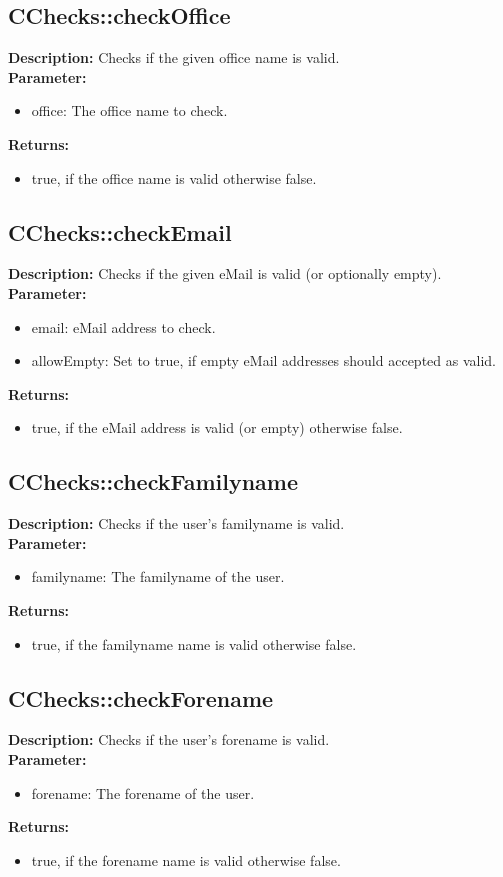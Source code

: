 \subsection{CChecks::checkOffice}
\textbf{Description:} Checks if the given office name is valid.\\
\textbf{Parameter:}
\begin{itemize}
\item office: The office name to check.
\end{itemize}
\textbf{Returns:}
\begin{itemize}
\item true, if the office name is valid otherwise false.
\end{itemize}

\subsection{CChecks::checkEmail}
\textbf{Description:} Checks if the given eMail is valid (or optionally empty).\\
\textbf{Parameter:}
\begin{itemize}
\item email: eMail address to check.
\item allowEmpty: Set to true, if empty eMail addresses should accepted as valid.
\end{itemize}
\textbf{Returns:}
\begin{itemize}
\item true, if the eMail address is valid (or empty) otherwise false.
\end{itemize}

\subsection{CChecks::checkFamilyname}
\textbf{Description:} Checks if the user's familyname is valid.\\
\textbf{Parameter:}
\begin{itemize}
\item familyname: The familyname of the user.
\end{itemize}
\textbf{Returns:}
\begin{itemize}
\item true, if the familyname name is valid otherwise false.
\end{itemize}

\subsection{CChecks::checkForename}
\textbf{Description:} Checks if the user's forename is valid.\\
\textbf{Parameter:}
\begin{itemize}
\item forename: The forename of the user.
\end{itemize}
\textbf{Returns:}
\begin{itemize}
\item true, if the forename name is valid otherwise false.
\end{itemize}

